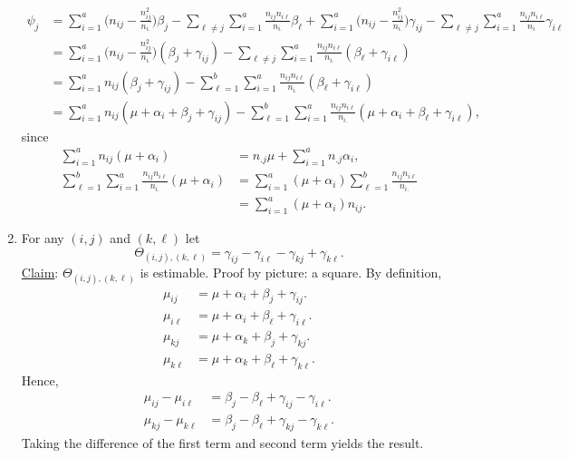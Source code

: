 \begin{enumerate}[(1)]
          \begin{align*}
              \psi_j
               & =\sum_{i=1}^{a}\biggl(n_{ij}-\frac{n_{ij}^2}{n_{i.}}\biggr)\beta_j
              -\sum_{\ell \ne j}\sum_{i=1}^{a}\frac{n_{ij}n_{i\ell}}{n_{i.}}\beta_\ell
              +\sum_{i=1}^{a}\biggl(n_{ij}-\frac{n_{ij}^2}{n_{i.}}\biggr)\gamma_{ij}-\sum_{\ell \ne j}\sum_{i=1}^{a}\frac{n_{ij}n_{i\ell}}{n_{i.}}\gamma_{i\ell}                \\
               & =\sum_{i=1}^{a}\biggl(n_{ij}-\frac{n_{ij}^2}{n_{i.}}\biggr)(\beta_j+\gamma_{ij})
              -\sum_{\ell\ne j}\sum_{i=1}^{a}\frac{n_{ij}n_{i\ell}}{n_{i.}}(\beta_\ell+\gamma_{i\ell})                                                                          \\
               & =\sum_{i=1}^{a}n_{ij}(\beta_j+\gamma_{ij})-\sum_{\ell=1}^{b}\sum_{i=1}^{a}\frac{n_{ij}n_{i\ell}}{n_{i.}}(\beta_\ell+\gamma_{i\ell})                            \\
               & =\sum_{i=1}^{a}n_{ij}(\mu+\alpha_i+\beta_j+\gamma_{ij})-\sum_{\ell=1}^{b}\sum_{i=1}^{a}\frac{n_{ij}n_{i\ell}}{n_{i.}}(\mu+\alpha_i+\beta_\ell+\gamma_{i\ell}),
          \end{align*}
          since
          \begin{align*}
              \sum_{i=1}^{a}n_{ij}(\mu+\alpha_i) & =n_{.j}\mu+\sum_{i=1}^{a}n_{.j}\alpha_i,                                     \\
              \sum_{\ell=1}^{b}\sum_{i=1}^{a}\frac{n_{ij}n_{i\ell}}{n_{i.}}(\mu+\alpha_i)
                                                 & =\sum_{i=1}^{a}(\mu+\alpha_i)\sum_{\ell=1}^{b}\frac{n_{ij}n_{i\ell}}{n_{i.}} \\
                                                 & =\sum_{i=1}^{a}(\mu+\alpha_i)n_{ij}.
          \end{align*}
    \item For any $ (i,j) $ and $ (k,\ell) $ let
          \[
              \Theta_{(i,j),(k,\ell)}
              =\gamma_{ij}-\gamma_{i\ell}-\gamma_{kj}+\gamma_{k\ell}. \]
          \underline{Claim}: $ \Theta_{(i,j),(k,\ell)} $ is estimable. Proof by picture: a square.
          By definition,
          \begin{align*}
              \mu_{ij}    & =\mu+\alpha_i+\beta_j+\gamma_{ij}.       \\
              \mu_{i\ell} & =\mu+\alpha_i+\beta_\ell+\gamma_{i\ell}. \\
              \mu_{kj}    & =\mu+\alpha_k+\beta_j+\gamma_{kj}.       \\
              \mu_{k\ell} & =\mu+\alpha_k+\beta_\ell+\gamma_{k\ell}.
          \end{align*}
          Hence,
          \begin{align*}
              \mu_{ij}-\mu_{i\ell} & =\beta_j-\beta_\ell+\gamma_{ij}-\gamma_{i\ell}. \\
              \mu_{kj}-\mu_{k\ell} & =\beta_j-\beta_\ell+\gamma_{kj}-\gamma_{k\ell}.
          \end{align*}
          Taking the difference of the first term and second term yields the result.
\end{enumerate}
